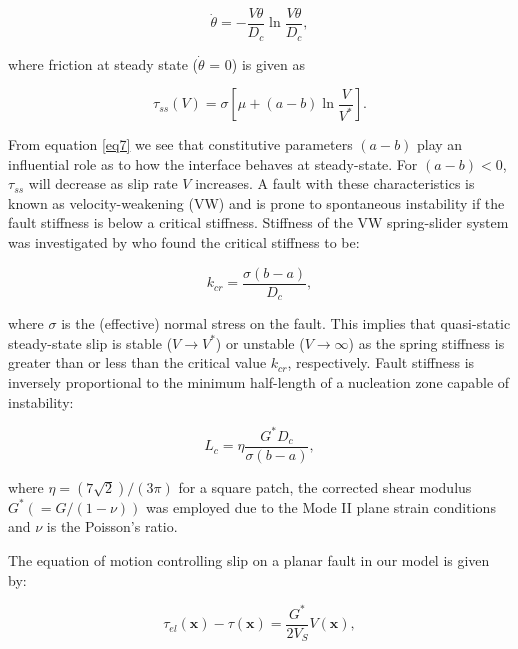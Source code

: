 \documentclass[preprint,1p, 10pt,authoryear]{elsarticle}
\begin{document}
\begin{equation}
\label{eq6}
\dot{\theta} = - \frac{V\theta}{D_{c}}\ln\frac{V\theta}{D_{c}},
\end{equation}   

\noindent where friction at steady state ($\dot{\theta} $ = 0) is given as

\begin{equation}
\label{eq7}
\tau_{ss} \left( V \right) = \sigma \left[\mu + \left(a - b \right)\ln\frac{V}{V^{*}}\right].
\end{equation}   

\noindent From equation \eqref{eq7} we see that constitutive parameters $\left(a - b \right)$ play an influential role as to how the interface behaves at steady-state.  For $\left(a - b \right) < 0$, $\tau_{ss}$ will decrease as slip rate $V$ increases.  A fault with these characteristics is known as velocity-weakening (VW) and is prone to spontaneous instability if the fault stiffness is below a critical stiffness. Stiffness of the VW spring-slider system was investigated by \citet{Ranjith1999} who found the critical stiffness to be:

\begin{equation}
\label{eq9}
k_{cr}=\frac{\sigma \left( b-a \right)}{D_{c}},
\end{equation}   

\noindent where $\sigma$ is the (effective) normal stress on the fault. This implies that quasi-static steady-state slip is stable ($V \rightarrow V^{*}$) or unstable ($V \rightarrow \infty$) as the spring stiffness is greater than or less than the critical value $k_{cr}$, respectively. Fault stiffness is inversely proportional to the minimum half-length of a nucleation zone capable of instability:

\begin{equation}
\label{eq8}
L_{c} = \eta \frac{G^{*} D_{c}}{ \sigma \left( b-a\right)},
\end{equation}   

\noindent where $\eta = (7\sqrt{2})/(3\pi)$ \citep{Dieterich1992} for a square patch, the corrected shear modulus $G^{*} (= G/(1-\nu))$ was employed due to the Mode II plane strain conditions and $\nu$ is the Poisson's ratio. 

The equation of motion controlling slip on a planar fault in our model is given by:

\begin{equation}
\label{eq8a}
\tau_{el}\left( \mathbf{x} \right) - \tau\left( \mathbf{x} \right) = \frac{G^{*}}{2 V_{S}} V(\mathbf{x}),
\end{equation}  
\end{document}

